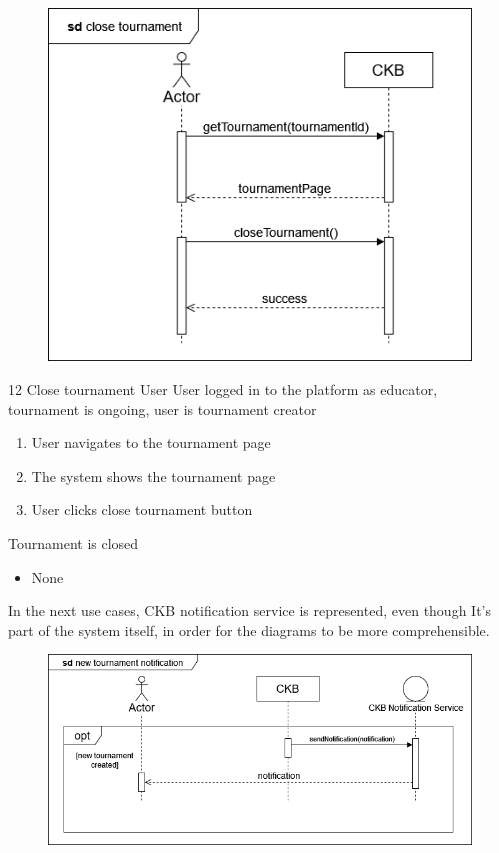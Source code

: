 \usecase
{
    \begin{figure}[H]
        \centering
        \includegraphics[width=\textwidth]{src/sequence_diagrams/closetourn.png}
    \end{figure}
}
{12}
{Close tournament} %
{User} %
{User logged in to the platform as educator, tournament is ongoing, user is tournament creator} %
{ %
    \begin{enumerate}
        \item User navigates to the tournament page
        \item The system shows the tournament page
        \item User clicks close tournament button
    \end{enumerate}
}
{Tournament is closed} %
{ %
    \begin{itemize}
        \item None
    \end{itemize}
}
{ %

}
In the next use cases, CKB notification service is represented, even though It's part of the system itself, in order for the diagrams 
to be more comprehensible.
\usecase
{
    \begin{figure}[H]
        \centering
        \includegraphics[width=\textwidth]{src/sequence_diagrams/notifytourn.png}
    \end{figure}
}
